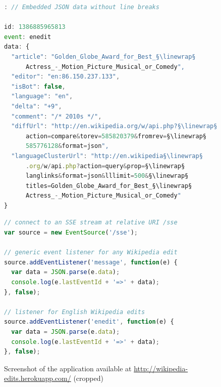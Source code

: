 \documentclass{sig-alternate}
\newcommand{\inlinelistingsize}{\fontsize{8pt}{11pt}}
\let\oldurl\url
\renewcommand{\url}[1]{\inlinelistingsize\oldurl{#1}}
\newcommand{\linewrap}{\raisebox{-.6ex}{\textcolor{grey}{$\hookleftarrow$}}}
\begin{document}
\begin{figure}[h!]
\begin{lstlisting}[caption={Server-Sent Event of type ``enedit''
  (formatted for legibility, \texttt{data:} allows no line breaks)},
  label=code:sse-server, language=JavaScript]
: // Embedded JSON data without line breaks

id: 1386885965813
event: enedit
data: {
  "article": "Golden_Globe_Award_for_Best_§\linewrap§
      Actress_-_Motion_Picture_Musical_or_Comedy",
  "editor": "en:86.150.237.133",
  "isBot": false,
  "language": "en",
  "delta": "+9",
  "comment": "/* 2010s */",
  "diffUrl": "http://en.wikipedia.org/w/api.php?§\linewrap§
      action=compare&torev=585820379&fromrev=§\linewrap§
      585776128&format=json",
  "languageClusterUrl": "http://en.wikipedia§\linewrap§
      .org/w/api.php?action=query&prop=§\linewrap§
      langlinks&format=json&lllimit=500&§\linewrap§
      titles=Golden_Globe_Award_for_Best_§\linewrap§
      Actress_-_Motion_Picture_Musical_or_Comedy"
}
\end{lstlisting}

\begin{lstlisting}[caption={Creation of an \texttt{EventSource}
  object and registration of two event listeners},
  label=code:sse-client, language=JavaScript]
// connect to an SSE stream at relative URI /sse
var source = new EventSource('/sse');

// generic event listener for any Wikipedia edit
source.addEventListener('message', function(e) {
  var data = JSON.parse(e.data);
  console.log(e.lastEventId + '=>' + data);
}, false);

// listener for English Wikipedia edits
source.addEventListener('enedit', function(e) {
  var data = JSON.parse(e.data);
  console.log(e.lastEventId + '=>' + data);
}, false);
\end{lstlisting}
\end{figure}

\begin{figure}[h!]
  \centering
  \caption{Screenshot of the application available at \url{http://wikipedia-edits.herokuapp.com/} (cropped)}
  \label{fig:screenshot}
\end{figure}
\end{document}
